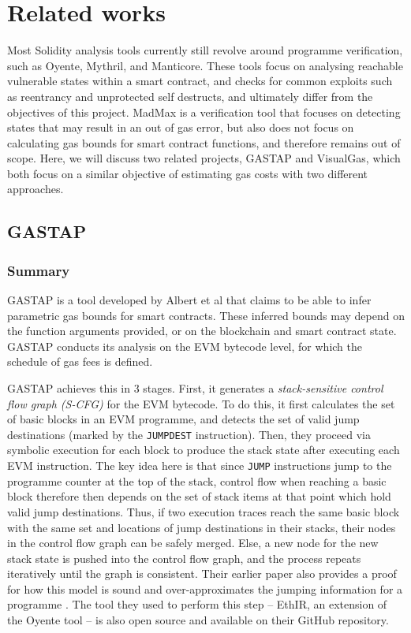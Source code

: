 \chapter{Related works}
\label{chap:related}

Most Solidity analysis tools currently still revolve around programme verification, such 
as Oyente, Mythril, and Manticore. These tools focus on analysing reachable vulnerable
states within a smart contract, and checks for common exploits such as reentrancy and unprotected
self destructs, and ultimately differ from the objectives of this project. MadMax is a
verification tool that focuses on detecting states that may result in an out of gas error, but
also does not focus on calculating gas bounds for smart contract functions, and therefore
remains out of scope. Here, we will discuss two related projects, GASTAP and VisualGas, which
both focus on a similar objective of estimating gas costs with two different approaches.

\section{GASTAP}

\subsection{Summary}

GASTAP is a tool developed by Albert et al \cite{dontrunonfumes} that claims to be able to
infer parametric gas bounds for smart contracts. These inferred bounds may depend on the
function arguments provided, or on the blockchain and smart contract state. GASTAP conducts
its analysis on the EVM bytecode level, for which the schedule of gas fees is defined.

GASTAP achieves this in 3 stages. First, it generates a \textit{stack-sensitive control flow graph (S-CFG)}
for the EVM bytecode. To do this, it first calculates the set of basic blocks in an EVM programme,
and detects the set of valid jump destinations (marked by the \texttt{JUMPDEST} instruction). Then,
they proceed via symbolic execution for each block to produce the stack state after executing each EVM instruction.
The key idea here is that since \texttt{JUMP} instructions jump to the programme counter at the 
top of the stack, control flow when reaching a basic block therefore then depends on the set 
of stack items at that point which hold valid jump destinations. Thus, if two execution traces
reach the same basic block with the same set and locations of jump destinations in their stacks, 
their nodes in the control flow graph can be safely merged. Else, a new node for the new stack
state is pushed into the control flow graph, and the process repeats iteratively until the graph
is consistent. Their earlier paper also provides a proof for how this model is sound and over-approximates 
the jumping information for a programme \cite{constructcfg}. The tool they used to perform this step -- 
EthIR, an extension of the Oyente tool -- is also open source and available on their GitHub repository.

